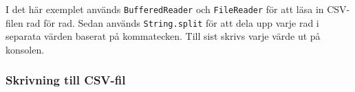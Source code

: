 I det här exemplet används \texttt{BufferedReader} och
\texttt{FileReader} för att läsa in CSV-filen rad för rad. Sedan används
\texttt{String.split} för att dela upp varje rad i separata värden
baserat på kommatecken. Till sist skrivs varje värde ut på konsolen.

\hypertarget{skrivning-till-csv-fil}{%
\subsubsection{Skrivning till CSV-fil}\label{skrivning-till-csv-fil}}

\hypertarget{cb2}{}
\begin{Shaded}
\begin{Highlighting}[]
 \OperatorTok{;}
 \OperatorTok{;}
 \OperatorTok{;}
 \OperatorTok{;}

 \OperatorTok{\{}
       \OperatorTok{(}\OperatorTok{[]}\OperatorTok{)} \OperatorTok{\{}
        \OperatorTok{\textless{}}\OperatorTok{\textgreater{}}\OperatorTok{=}  \OperatorTok{\textless{}\textgreater{}();}
\OperatorTok{(} \OperatorTok{(}\OperatorTok{,} \OperatorTok{,} \OperatorTok{,} \OperatorTok{));}
\OperatorTok{(} \OperatorTok{(}\OperatorTok{,} \OperatorTok{,} \OperatorTok{,} \OperatorTok{));}
\OperatorTok{(} \OperatorTok{(}\OperatorTok{,} \OperatorTok{,} \OperatorTok{,} \OperatorTok{));}


\end{Highlighting}
\end{Shaded}

